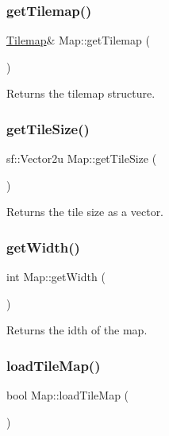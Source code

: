 \subsubsection{\texorpdfstring{get\+Tilemap()}{getTilemap()}}
{\footnotesize\ttfamily \hyperlink{classTilemap}{Tilemap}\& Map\+::get\+Tilemap (\begin{DoxyParamCaption}{ }\end{DoxyParamCaption})\hspace{0.3cm}{\ttfamily [inline]}}

Returns the tilemap structure. \hypertarget{classMap_a97717641214ebe1e105b4afcf412fbb3}{}\label{classMap_a97717641214ebe1e105b4afcf412fbb3} 
\subsubsection{\texorpdfstring{get\+Tile\+Size()}{getTileSize()}}
{\footnotesize\ttfamily sf\+::\+Vector2u Map\+::get\+Tile\+Size (\begin{DoxyParamCaption}{ }\end{DoxyParamCaption})\hspace{0.3cm}{\ttfamily [inline]}}

Returns the tile size as a vector. \hypertarget{classMap_afd34d12227676b3cebeed9f5fae2508f}{}\label{classMap_afd34d12227676b3cebeed9f5fae2508f} 
\subsubsection{\texorpdfstring{get\+Width()}{getWidth()}}
{\footnotesize\ttfamily int Map\+::get\+Width (\begin{DoxyParamCaption}{ }\end{DoxyParamCaption})\hspace{0.3cm}{\ttfamily [inline]}}

Returns the idth of the map. \hypertarget{classMap_ae184e30853864425b327b2d5b3cba48b}{}\label{classMap_ae184e30853864425b327b2d5b3cba48b} 
\subsubsection{\texorpdfstring{load\+Tile\+Map()}{loadTileMap()}}
{\footnotesize\ttfamily bool Map\+::load\+Tile\+Map (\begin{DoxyParamCaption}{ }\end{DoxyParamCaption})}

